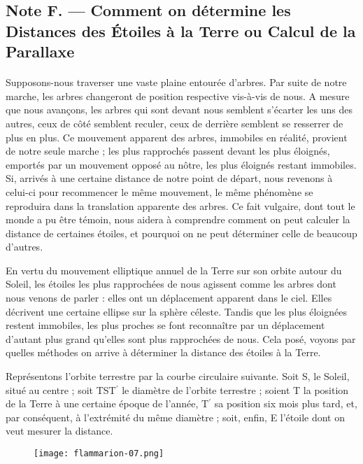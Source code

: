 \documentclass[a4paper, 11pt, oneside]{article}
\begin{document}
\subsection{Note F. --- Comment on détermine les Distances des Étoiles à la Terre ou Calcul de la Parallaxe}
\paragraph{}
Supposons-nous traverser une vaste plaine entourée d'arbres. Par suite de notre marche, les arbres changeront de position respective vis-à-vis de nous. A mesure que nous avançons, les arbres qui sont devant nous semblent s'écarter les uns des autres, ceux de côté semblent reculer, ceux de derrière semblent se resserrer de plus en plus. Ce mouvement apparent des arbres, immobiles en réalité, provient de notre seule marche ; les plus rapprochés passent devant les plus éloignés, emportés par un mouvement opposé au nôtre, les plus éloignés restant immobiles. Si, arrivés à une certaine distance de notre point de départ, nous revenons à celui-ci pour recommencer le même mouvement, le même phénomène se reproduira dans la translation apparente des arbres. Ce fait vulgaire, dont tout le monde a pu être témoin, nous aidera à comprendre comment on peut calculer la distance de certaines étoiles, et pourquoi on ne peut déterminer celle de beaucoup d'autres.

En vertu du mouvement elliptique annuel de la Terre sur son orbite autour du Soleil, les étoiles les plus rapprochées de nous agissent comme les arbres dont nous venons de parler : elles ont un déplacement apparent dans le ciel. Elles décrivent une certaine ellipse sur la sphère céleste. Tandis que les plus éloignées restent immobiles, les plus proches se font reconnaître par un déplacement d'autant plus grand qu'elles sont plus rapprochées de nous. Cela posé, voyons par quelles méthodes on arrive à déterminer la distance des étoiles à la Terre.

Représentons l'orbite terrestre par la courbe circulaire suivante. Soit S, le Soleil, situé au centre ; soit TST$^{\prime}$ le diamètre de l'orbite terrestre ; soient T la position de la Terre à une certaine époque de l'année, T$^{\prime}$ sa position six mois plus tard, et, par conséquent, à l'extrémité du même diamètre ; soit, enfin, E l'étoile dont on veut mesurer la distance.
\begin{figure}[H]
\centering
\texttt{[image: flammarion-07.png]}
\end{figure}
\end{document}
